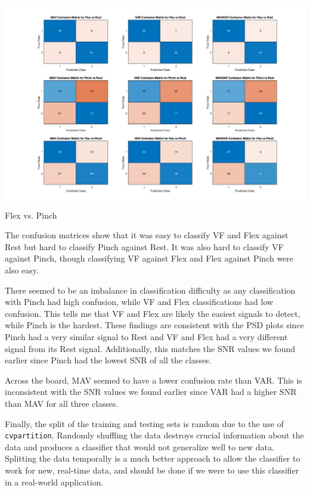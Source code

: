 \documentclass[12pt]{article}
\begin{document}
\begin{center}
    \includegraphics[width=\textwidth]{flex_pinch.jpg}
    Flex vs. Pinch
\end{center}

The confusion matrices show that it was easy to classify VF and Flex against Rest but hard to classify Pinch against Rest. It was also hard to classify VF against Pinch, though classifying VF against Flex and Flex against Pinch were also easy. 

There seemed to be an imbalance in classification difficulty as any classification with Pinch had high confusion, while VF and Flex classifications had low confusion. This tells me that VF and Flex are likely the easiest signals to detect, while Pinch is the hardest. These findings are consistent with the PSD plots since Pinch had a very similar signal to Rest and VF and Flex had a very different signal from its Rest signal. Additionally, this matches the SNR values we found earlier since Pinch had the lowest SNR of all the classes.

Across the board, MAV seemed to have a lower confusion rate than VAR. This is inconsistent with the SNR values we found earlier since VAR had a higher SNR than MAV for all three classes.

Finally, the split of the training and testing sets is random due to the use of \texttt{cvpartition}. Randomly shuffling the data destroys crucial information about the data and produces a classifier that would not generalize well to new data. Splitting the data temporally is a much better approach to allow the classifier to work for new, real-time data, and should be done if we were to use this classifier in a real-world application.
\end{document}
